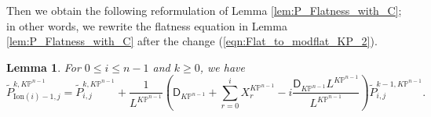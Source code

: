 \documentclass[12pt]{amsart}
\newtheorem{lem}[prop]{Lemma}
\numberwithin{equation}{section}
\newcommand{\KP}{K\mathbb{P}}
\begin{document}
Then we obtain the following reformulation of Lemma \ref{lem:P_Flatness_with_C}; in other words, we rewrite the flatness equation in Lemma \ref{lem:P_Flatness_with_C} after the change (\ref{eqn:Flat_to_modflat_KP_2}).

\begin{lem}\label{lem:Modified_Flatness_before_Ai}
For $0\leq i \leq n-1$ and $k\geq 0$, we have
\begin{equation*}
\widetilde{P}_{\mathrm{Ion}(i)-1,j}^{k,\KP^{n-1}}=\widetilde{P}_{i,j}^{k,\KP^{n-1}}+\frac{1}{L^{\KP^{n-1}}}\left(\mathsf{D}_{\KP^{n-1}}+\sum_{r=0}^i X^{\KP^{n-1}}_r-i\frac{\mathsf{D}_{\KP^{n-1}}L^{\KP^{n-1}}}{L^{\KP^{n-1}}}\right)\widetilde{P}_{i,j}^{k-1,\KP^{n-1}}.
\end{equation*}
\end{lem}
\end{document}
